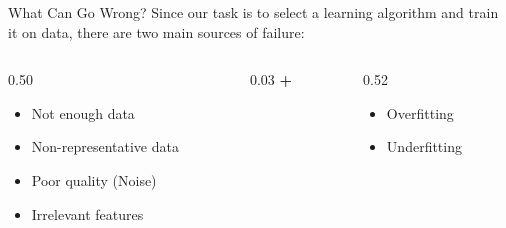 \begin{frame}{What Can Go Wrong?}
    Since our task is to select a learning algorithm and train it on data, there are two main sources of failure:
    \vspace{1em}
    \begin{columns}[c]
        \begin{column}{0.50\textwidth}
            \centering
            \begin{tcolorbox}[colback=red!5, colframe=red!60, title=\textbf{1. Bad Data}]
                \begin{itemize}
                    \item Not enough data
                    \item Non-representative data
                    \item Poor quality (Noise)
                    \item Irrelevant features
                \end{itemize}
            \end{tcolorbox}
        \end{column}
        \begin{column}{0.03\textwidth}
            \centering \textbf{+}
        \end{column}
        \begin{column}{0.52\textwidth}
            \centering
            \begin{tcolorbox}[colback=blue!5, colframe=blue!60, title=\textbf{2. Bad Algorithm}]
                \begin{itemize}
                    \item Overfitting
                    \item Underfitting
                \end{itemize}
            \end{tcolorbox}
        \end{column}
    \end{columns}
\end{frame}


